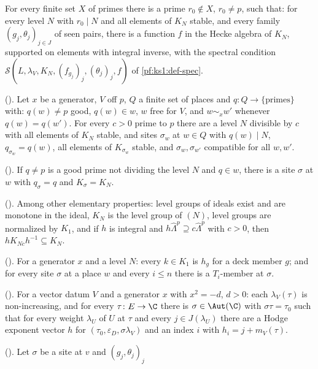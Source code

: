 \begin{description}[style=unboxed,leftmargin=1em,nosep]
  For every finite set $X$ of primes there is a prime $r_0\notin X$, $r_0\ne p$, such that: for every level $N$ with $r_0\mid N$
  and all elements of $K_N$ stable, and every family $(g_j,\theta_j)_{j\in J}$ of seen pairs, there is a function $f$ in the Hecke
  algebra of $K_N$, supported on elements with integral inverse, with the spectral condition
  $\mathcal S(L,\lambda_V,K_N,(f_{g_j})_j,(\theta_j)_j,f)$ of \cref{pf:ks1:def-spec}.
\item[$\sfname{SiteEx}$] (). Let $x$ be a generator, $V$ off $p$, $Q$ a
  finite set of places and $q\colon Q\to\{\text{primes}\}$ with: $q(w)\ne p$ good, $q(w)\in w$, $w$ free for $V$, and $w\sim_xw'$
  whenever $q(w)=q(w')$. For every $c>0$ prime to $p$ there are a level $N$ divisible by $c$ with all elements of $K_N$
  stable, and sites $\sigma_w$ at $w\in Q$ with $q(w)\mid N$, $q_{\sigma_w}=q(w)$, all elements of $K_{\sigma_w}$ stable, and
  $\sigma_w,\sigma_{w'}$ compatible for all $w,w'$.
\item[$\sfname{SiteTriv}$] (). If $q\ne p$ is a good prime not
  dividing the level $N$ and $q\in w$, there is a site $\sigma$ at $w$ with $q_\sigma=q$ and $K_\sigma=K_N$.
\item[$\sfname{LevBasic}$] (). Among other elementary properties: level
  groups of ideals exist and are monotone in the ideal, $K_N$ is the level group of $(N)$, level groups are normalized by $K_1$, and if $h$
  is integral and $h\hat\Lambda^p\supseteq c\hat\Lambda^p$ with $c>0$, then $hK_{Nc}h^{-1}\subseteq K_N$.
\item[$\sfname{MemEx}$] (). For a generator $x$ and a level $N$: every
  $k\in K_1$ is $h_g$ for a deck member $g$; and for every site $\sigma$ at a place $w$ and every $i\le n$ there is a $T_i$-member
  at $\sigma$.
\item[$\sfname{ExpOf}$] (). For a vector datum $V$ and a generator $x$
  with $x^2=-d$, $d>0$: each $\lambda_V(\tau)$ is non-increasing, and for every $\tau\colon E\to\C$ there is $\sigma\in\Aut(\C)$ with
  $\sigma\tau=\tau_0$ such that for every weight $\lambda_U$ of $U$ at $\tau$ and every $j\in J(\lambda_U)$ there are a Hodge exponent vector
  $h$ for $(\tau_0,\varepsilon_D,\sigma\lambda_V)$ and an index $i$ with $h_i=j+m_V(\tau)$.
\item[$\sfname{GoodOf}$] (). Let $\sigma$ be a site at $v$ and $(g_j,\theta_j)_j$

\end{description}
